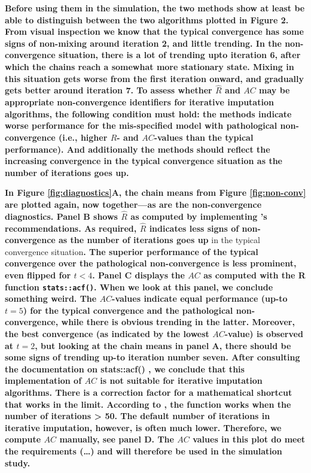 \documentclass[Royal,times,sageh]{sagej}
\begin{document}
\textbf{Before using them in the simulation, the two methods show at
least be able to distinguish between the two algorithms plotted in
Figure 2. From visual inspection we know that the typical convergence
has some signs of non-mixing around iteration 2, and little trending. In
the non-convergence situation, there is a lot of trending upto iteration
6, after which the chains reach a somewhat more stationary state. Mixing
in this situation gets worse from the first iteration onward, and
gradually gets better around iteration 7. To assess whether
\(\widehat{R}\) and \(AC\) may be appropriate non-convergence
identifiers for iterative imputation algorithms, the following condition
must hold: the methods indicate worse performance for the mis-specified
model with pathological non-convergence (i.e., higher \(\widehat{R}\)-
and \(AC\)-values than the typical performance). And additionally the
methods should reflect the increasing convergence in the typical
convergence situation as the number of iterations goes up.}

\textbf{In Figure \ref{fig:diagnostics}A, the chain means from Figure
\ref{fig:non-conv} are plotted again, now together---as are the
non-convergence diagnostics. Panel B shows \(\widehat{R}\) as computed
by implementing \citet{veht19} 's recommendations. As required,
\(\widehat{R}\) indicates less signs of non-convergence as the number of
iterations goes up }in the typical convergence situation\textbf{. The
superior performance of the typical convergence over the pathological
non-convergence is less prominent, even flipped for \(t<4\). Panel C
displays the \(AC\) as computed with the R function
\texttt{stats::acf()}. When we look at this panel, we conclude something
weird. The \(AC\)-values indicate equal performance (up-to \(t=5\)) for
the typical convergence and the pathological non-convergence, while
there is obvious trending in the latter. Moreover, the best convergence
(as indicated by the lowest \(AC\)-value) is observed at \(t=2\), but
looking at the chain means in panel A, there should be some signs of
trending up-to iteration number seven. After consulting the
documentation on stats::acf() \citep{R}, we conclude that this
implementation of \(AC\) is not suitable for iterative imputation
algorithms. There is a correction factor for a mathematical shortcut
that works in the limit. According to \citet{box15}, the function works
when the number of iterations \textgreater{} 50. The default number of
iterations in iterative imputation, however, is often much lower.
Therefore, we compute \(AC\) manually, see panel D. The \(AC\) values in
this plot do meet the requirements (\ldots) and will therefore be used
in the simulation study.}
\end{document}
